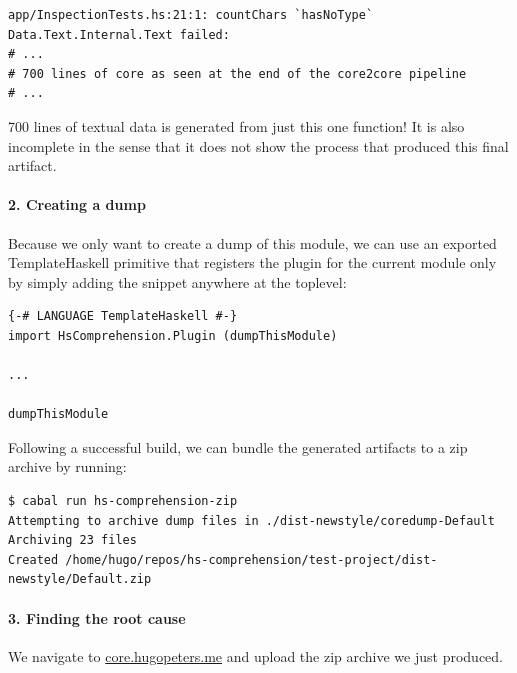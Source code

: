 \begin{verbatim}
app/InspectionTests.hs:21:1: countChars `hasNoType` Data.Text.Internal.Text failed:
# ...
# 700 lines of core as seen at the end of the core2core pipeline
# ...
\end{verbatim}

700 lines of textual data is generated from just this one function!
It is also incomplete in the sense that it does not show the process that produced this final
artifact.

\paragraph{2. Creating a dump}

Because we only want to create a dump of this module, we can use an exported TemplateHaskell primitive
that registers the plugin for the current module only by simply adding the  snippet 
anywhere at the toplevel: 

\begin{listing}[H]
\begin{verbatim}
{-# LANGUAGE TemplateHaskell #-}
import HsComprehension.Plugin (dumpThisModule)

...

dumpThisModule
\end{verbatim}
\end{listing}

Following a successful build, we can bundle the generated artifacts to a zip archive by running:

\begin{listing}[H]
\begin{verbatim}
$ cabal run hs-comprehension-zip
Attempting to archive dump files in ./dist-newstyle/coredump-Default
Archiving 23 files
Created /home/hugo/repos/hs-comprehension/test-project/dist-newstyle/Default.zip
\end{verbatim}
\end{listing}

\paragraph{3. Finding the root cause}
We navigate to \href{https://core.hugopeters.me}{core.hugopeters.me} and upload the zip archive we just
produced.

